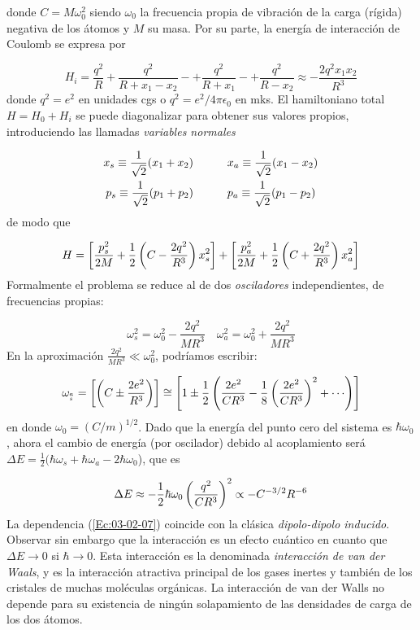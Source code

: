 donde $C=M\omega_0^2$ siendo $\omega_0$ la frecuencia propia de vibración de la carga (rígida) negativa de los átomos y $M$ su masa. Por su parte, la energía de interacción de Coulomb se expresa por 

\begin{equation}
    H_i = \frac{q^2}{R} + \frac{q^2}{R+x_1-x_2} - + \frac{q^2}{R+x_1} - + \frac{q^2}{R-x_2} \approx - \frac{2q^2x_1x_2}{R^3}
\end{equation}
donde $q^2=e^2$ en unidades cgs o $q^2 = e^2 / 4\pi \epsilon_0$ en mks. El hamiltoniano total $H=H_0+H_i$ se puede diagonalizar para obtener sus valores propios, introduciendo las llamadas {\it variables normales}

\begin{align}
    x_s \equiv \frac{1}{\sqrt{2}} (x_1 + x_2)  \quad \quad \quad  & x_a \equiv \frac{1}{\sqrt{2}} (x_1-x_2) \\
    p_s \equiv \frac{1}{\sqrt{2}} (p_1 + p_2) \quad \quad \quad & p_a \equiv \frac{1}{\sqrt{2}} (p_1-p_2) 
\end{align}
de modo que 

\begin{equation}
    H = \left[ \frac{p_s^2}{2M}+ \frac{1}{2} \left( C- \frac{2q^2}{R^3} \right)x_s^2 \right] + \left[ \frac{p_a^2}{2M}+ \frac{1}{2} \left( C+ \frac{2q^2}{R^3} \right)x_a^2 \right] 
\end{equation}
Formalmente el problema se reduce al de dos \textit{osciladores} independientes, de frecuencias propias:

\begin{equation}
\omega_s^2 = \omega_0^2 - \frac{2q^2}{MR^3} \quad \omega_a^2 = \omega_0^2 + \frac{2q^2}{MR^3}
\end{equation}
En la aproximación  $ \frac{2q^2}{MR^3} \ll \omega_0^2$, podríamos escribir:

\begin{equation}
	\omega_{^a_s} = \ccorchetes{\parentesis{C\pm \frac{2e^2}{R^3}}} \cong \ccorchetes{1 \pm \frac{1}{2} \parentesis{\frac{2e^2}{CR^3} - \frac{1}{8} \parentesis{\frac{2e^2}{CR^3}}^2 + \cdots }}
\end{equation}
en donde $\omega_0=(C/m)^{1/2}$. Dado que la energía del punto cero del sistema es $\hbar \omega_0$, ahora el cambio de energía (por oscilador) debido al acoplamiento será $\Delta E = \frac{1}{2} (\hbar \omega_s + \hbar \omega_a - 2 \hbar \omega_0$), que  es

\begin{equation}
\Delta E \approx - \frac{1}{2} \hbar \omega_0 \left( \frac{q^2}{CR^3} \right)^2 \propto -C^{-3/2}  R^{-6} \label{Ec:03-02-07}
\end{equation}
La dependencia (\ref{Ec:03-02-07}) coincide con la clásica \textit{dipolo-dipolo inducido}. Observar sin embargo que la interacción es un efecto cuántico en cuanto que $\Delta E \rightarrow 0$ si $\hbar \rightarrow 0$. Esta interacción es la denominada \textit{interacción de van der Waals}, y es la interacción atractiva principal de los gases inertes y también de los cristales de muchas moléculas orgánicas. La interacción de van der Walls no depende para su existencia de ningún solapamiento de las densidades de carga de los dos átomos. 

